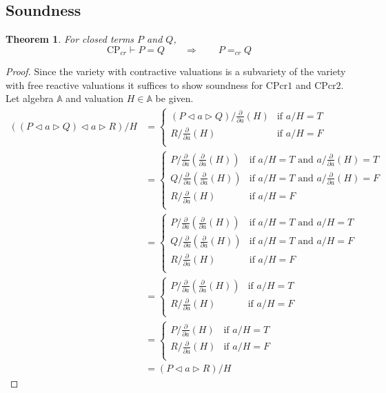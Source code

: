 \documentclass[a4paper,twoside,openright]{report}
\newcommand{\dd}[1]{\frac{\partial}{\partial #1}}
\newcommand{\CPcr}[1]{\ensuremath{\mathrm{CPcr#1}}}
\newcommand{\lef}{\ensuremath{\triangleleft}}
\newcommand{\rig}{\ensuremath{\triangleright}}
\newtheorem{thm}[theorem]{Theorem}
\begin{document}
\subsection{Soundness}
\begin{thm}
For closed terms $P$ and $Q$,
\[
\text{CP}_{cr}\vdash P=Q\qquad\Longrightarrow\qquad P=_{cr}Q
\]
\end{thm}
\begin{proof}
Since the variety with contractive valuations is a subvariety of the variety with free reactive valuations it suffices to show soundness for $\CPcr1$ and $\CPcr2$. Let algebra $\mathbb{A}$ and valuation $H\in\mathbb{A}$ be given.
\begin{align*}
((P\lef a\rig Q)\lef a\rig R)/H &= 
\begin{cases}
(P\lef a\rig Q)/\dd a(H) & \text{if $a/H=T$}\\
R/\dd a(H) & \text{if $a/H=F$}\\
\end{cases}\\
&=\begin{cases}
P/\dd a(\dd a(H)) & \text{if $a/H=T$ and $a/\dd a(H)=T$}\\
Q/\dd a(\dd a(H)) & \text{if $a/H=T$ and $a/\dd a(H)=F$}\\
R/\dd a(H) & \text{if $a/H=F$}\\
\end{cases}\\
&=\begin{cases}
P/\dd a(\dd a(H)) & \text{if $a/H=T$ and $a/H=T$}\\
Q/\dd a(\dd a(H)) & \text{if $a/H=T$ and $a/H=F$}\\
R/\dd a(H) & \text{if $a/H=F$}\\
\end{cases}\\
&=\begin{cases}
P/\dd a(\dd a(H)) & \text{if $a/H=T$}\\
R/\dd a(H) & \text{if $a/H=F$}\\
\end{cases}\\
&=\begin{cases}
P/\dd a(H) & \text{if $a/H=T$}\\
R/\dd a(H) & \text{if $a/H=F$}\\
\end{cases}\\
&=(P\lef a\rig R)/H
\end{align*}


\end{proof}
\end{document}
